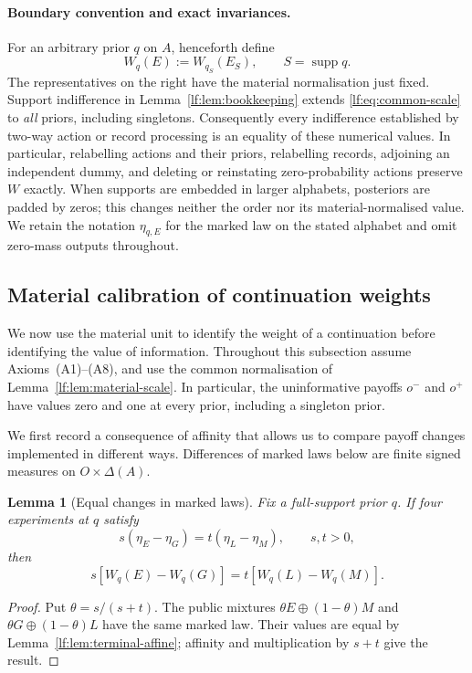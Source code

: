 \documentclass[11pt,a4paper]{article}
\newtheorem{lemma}[theorem]{Lemma}
\theoremstyle{definition}
\newcommand{\D}{\Delta}
\newcommand{\supp}{\operatorname{supp}}
\newcommand{\1}{\mathbf 1}
\begin{document}
\paragraph{Boundary convention and exact invariances.}
For an arbitrary prior $q$ on $A$, henceforth define
\begin{equation}
W_q(E):=W_{q_S}(E_S),\qquad S=\supp q.
\label{lf:eq:support-normalisation}
\end{equation}
The representatives on the right have the material normalisation just fixed.
Support indifference in Lemma~\ref{lf:lem:bookkeeping} extends
\eqref{lf:eq:common-scale} to \emph{all} priors, including singletons.
Consequently every indifference established by two-way action or record
processing is an equality of these numerical values.  In particular,
relabelling actions and their priors, relabelling records, adjoining an
independent dummy, and deleting or reinstating zero-probability actions
preserve $W$ exactly.  When supports are embedded in larger alphabets,
posteriors are padded by zeros; this changes neither the order nor its
material-normalised value.  We retain the notation $\eta_{q,E}$ for the
marked law on the stated alphabet and omit zero-mass outputs throughout.

\subsection{Material calibration of continuation weights}
\label{mf:sec:calibration}

We now use the material unit to identify the weight of a continuation before
identifying the value of information.  Throughout this subsection assume
Axioms~\textup{(A1)--(A8)}, and use the common normalisation of
Lemma~\ref{lf:lem:material-scale}.  In particular, the uninformative payoffs
$o^-$ and $o^+$ have values zero and one at every prior, including a
singleton prior.

We first record a consequence of affinity that allows us to compare payoff
changes implemented in different ways.  Differences of marked laws below are
finite signed measures on $O\times\D(A)$.

\begin{lemma}[Equal changes in marked laws]\label{mf:lem:scaled-differences}
Fix a full-support prior $q$.  If four experiments at $q$ satisfy
\[
 s(\eta_E-\eta_G)=t(\eta_L-\eta_M),\qquad s,t>0,
\]
then
\[
 s[W_q(E)-W_q(G)]=t[W_q(L)-W_q(M)].
\]
\end{lemma}

\begin{proof}
Put $\theta=s/(s+t)$.  The public mixtures
$\theta E\oplus(1-\theta)M$ and
$\theta G\oplus(1-\theta)L$ have the same marked law.  Their values are
equal by Lemma~\ref{lf:lem:terminal-affine}; affinity and multiplication by
$s+t$ give the result.
\end{proof}
\end{document}
